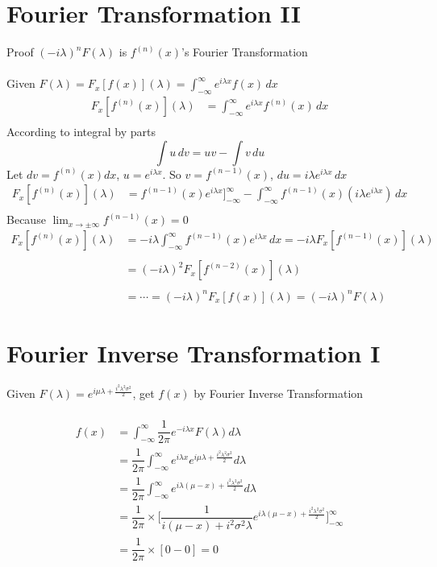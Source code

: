 \documentclass[12pt]{article}
\begin{document}
\section*{Fourier Transformation II}
Proof $(-i\lambda)^n F(\lambda)$ is $f^{(n)}(x)$'s Fourier Transformation\\\\
Given $F(\lambda) = F_x[f(x)](\lambda) = \int_{-\infty}^{\infty} e^{i\lambda x} f(x) \, dx$
\newline
\begin{align*}
    F_x[f^{(n)}(x)](\lambda) & = \int_{-\infty}^{\infty} e^{i\lambda x} f^{(n)}(x) \, dx \\
\end{align*}
According to integral by parts\\
\[
    \int u \, dv = uv - \int v \, du
\]
\newline
Let $dv = f^{(n)}(x)dx$, $u = e^{i\lambda x}$. So $v = f^{(n-1)}(x)$, $du = i\lambda e^{i\lambda x}\, dx$\\
\begin{align*}
    F_x[f^{(n)}(x)](\lambda) & = f^{(n-1)}(x)e^{i \lambda x}\Big]_{-\infty}^{\infty} - \int_{-\infty}^{\infty}f^{(n-1)}(x)(i\lambda e^{i \lambda x})\,  dx\\
\end{align*}
Because $\lim_{x\to\pm\infty}f^{(n-1)}(x)=0$\\
\begin{align*}
    F_x[f^{(n)}(x)](\lambda) & = -i\lambda \int_{-\infty}^{\infty}f^{(n-1)}(x)e^{i \lambda x}\, dx = -i\lambda F_x[f^{(n-1)}(x)](\lambda)\\\\
    & = (-i\lambda)^2 F_x[f^{(n-2)}(x)](\lambda)\\\\
    & = \cdots = (-i\lambda)^n F_x[f(x)](\lambda) = (-i\lambda)^n F(\lambda) 
\end{align*}
\section*{Fourier Inverse Transformation I}
Given $F(\lambda) = e^{i\mu\lambda+\frac{i^2\lambda^2\sigma^2}{2}}$, get $f(x)$ by Fourier Inverse Transformation\\\\
\begin{align*}
    f(x) & = \int_{-\infty}^{\infty} \dfrac{1}{2\pi}e^{-i\lambda x}F(\lambda)d\lambda\\
    & = \dfrac{1}{2\pi}\int_{-\infty}^{\infty} e^{i\lambda x}e^{i\mu\lambda+\frac{i^2\lambda^2\sigma^2}{2}}d\lambda\\
    & = \dfrac{1}{2\pi}\int_{-\infty}^{\infty} e^{i\lambda(\mu-x)+\frac{i^2\lambda^2\sigma^2}{2}}d\lambda\\
    & = \dfrac{1}{2\pi}\times \Bigg[\dfrac{1}{i(\mu-x)+i^2\sigma^2\lambda}e^{i\lambda(\mu-x)+\frac{i^2\lambda^2\sigma^2}{2}}\Bigg]_{-\infty}^{\infty}\\
    & = \dfrac{1}{2\pi}\times[0-0]=0
\end{align*}
\end{document}
